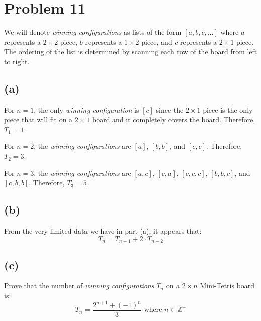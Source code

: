 \documentclass{article}
\begin{document}
\pagebreak

\section{Problem 11}
We will denote \textit{winning configurations} as lists of the form $[a, b, c, ...]$ where $a$ represents a $2 \times 2$ piece, $b$ represents a $1 \times 2$ piece, and $c$ represents a $2 \times 1$ piece. The ordering of the list is determined by scanning each row of the board from left to right.

\subsection{(a)}
For $n = 1$, the only \textit{winning configuration} is $[c]$ since the $2 \times 1$ piece is the only piece that will fit on a $2 \times 1$ board and it completely covers the board. Therefore, $T_1 = 1$.

For $n = 2$, the \textit{winning configurations} are $[a]$, $[b, b]$, and $[c, c]$. Therefore, $T_2 = 3$.

For $n = 3$, the \textit{winning configurations} are $[a, c]$, $[c, a]$, $[c, c, c]$, $[b, b, c]$, and $[c, b, b]$. Therefore, $T_3 = 5$.

\subsection{(b)}
From the very limited data we have in part (a), it appears that:
\begin{equation}\label{p11recurrence}
	T_n = T_{n - 1} + 2 \cdot T_{n - 2}
\end{equation}

\subsection{(c)}
Prove that the number of \textit{winning configurations} $T_n$ on a $2 \times n$ Mini-Tetris board is:
\begin{equation}\label{p11claim}
	T_n = \frac{2^{n + 1} + (-1)^n}{3} \text{ where } n \in \mathbb{Z^+}
\end{equation}
\end{document}

